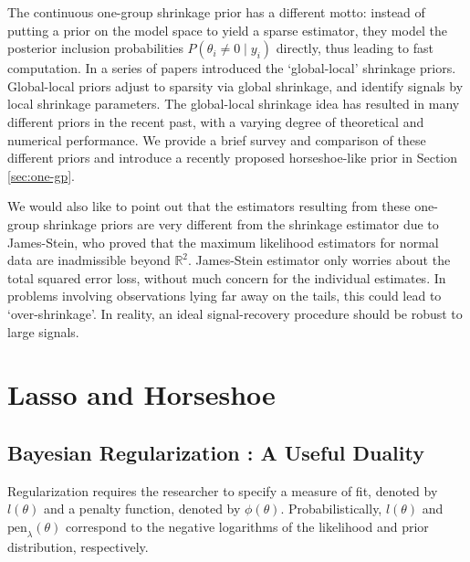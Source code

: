 \documentclass[11pt]{article}
\begin{document}
The continuous one-group shrinkage prior has a different motto: instead of putting a prior on the model space to yield a sparse estimator, they model the posterior inclusion probabilities $P(\theta_i \ne 0 \mid y_i)$ directly, thus leading to fast computation. In a series of papers \citet{carvalho2009handling, polson2010shrink, carvalho2010horseshoe, polson2012half} introduced the `global-local' shrinkage priors. Global-local priors adjust to sparsity via global shrinkage, and identify signals by local shrinkage parameters. The global-local shrinkage idea has resulted in many different priors in the recent past, with a varying degree of theoretical and numerical performance. We provide a brief survey and comparison of these different priors and introduce a recently proposed horseshoe-like prior in Section \ref{sec:one-gp}.   

We would also like to point out that the estimators resulting from these one-group shrinkage priors are very different from the shrinkage estimator due to James-Stein, who proved that the maximum likelihood estimators for normal data are inadmissible beyond $\mathbb{R}^2$. James-Stein estimator only worries about the total squared error loss, without much concern for the individual estimates. In problems involving observations lying far away on the tails, this could lead to `over-shrinkage'. In reality, an ideal signal-recovery procedure should be robust to large signals.


\section{Lasso and Horseshoe}
\subsection{Bayesian Regularization : A Useful Duality}

Regularization requires the researcher to specify a measure of fit, denoted by $l(\theta)$ and a penalty function, denoted by $ \phi(\theta)$. Probabilistically,  $l(\theta)$ and $\text{pen}_{\lambda}(\theta)$ correspond to the negative logarithms of the likelihood and prior distribution, respectively.  
\end{document}

